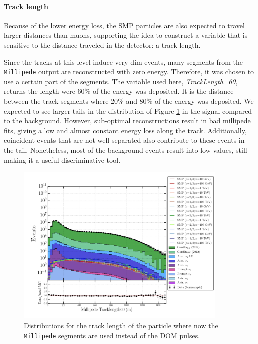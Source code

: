 \paragraph{Track length}
Because of the lower energy loss, the SMP particles are also expected to travel larger distances than muons, supporting the idea to construct a variable that is sensitive to the distance traveled in the detector: a track length.

Since the tracks at this level induce very dim events, many segments from the \texttt{Millipede} output are reconstructed with zero energy. Therefore, it was chosen to use a certain part of the segments. The variable used here, \textit{TrackLength\_60}, returns the length were 60\% of the energy was deposited. It is the distance between the track segments where 20\% and 80\% of the energy was deposited. We expected to see larger tails in the distribution of Figure \ref{fig:allmillipedevartracklength} in the signal compared to the background. However, sub-optimal reconstructions result in bad millipede fits, giving a low and almost constant energy loss along the track. Additionally, coincident events that are not well separated also contribute to these events in the tail. Nonetheless, most of the background events result into low values, still making it a useful discriminative tool. 

\begin{figure}
\centering
\includegraphics[width=0.9\textwidth]{chapter8/img/1D_stack_millipede_tracklength60.png}
\caption{Distributions for the track length of the particle where now the \texttt{Millipede} segments are used instead of the DOM pulses.}
\label{fig:allmillipedevartracklength}
\end{figure}


